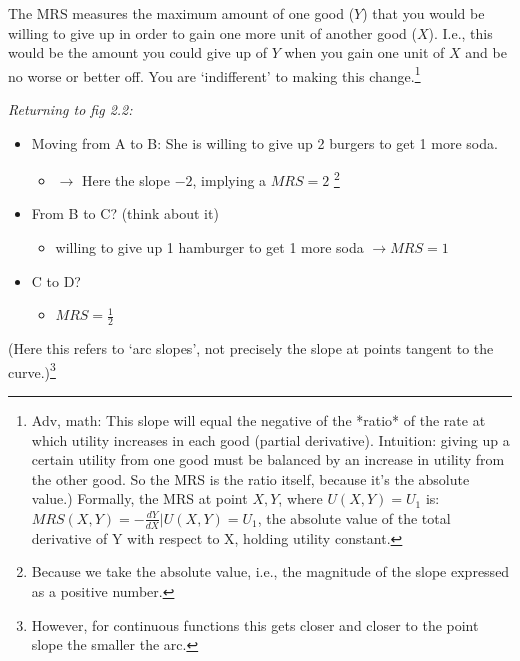 \documentclass[]{article}
\providecommand{\tightlist}{%
  \setlength{\itemsep}{0pt}\setlength{\parskip}{0pt}}
\begin{document}
The MRS measures the maximum amount of one good (\(Y\)) that you would
be willing to give up in order to gain one more unit of another good
(\(X\)). I.e., this would be the amount you could give up of \(Y\) when
you gain one unit of \(X\) and be no worse or better off. You are
`indifferent' to making this change.\footnote{\textcolor{RawSienna}{Adv, math: This slope will equal the negative of the *ratio* of the rate at which utility increases in each good (partial derivative).
  Intuition: giving up a certain utility from one good must be balanced by an increase in utility from the other good.
  So the MRS is the ratio itself, because it's the absolute value.) Formally, the MRS at point $X,Y$, where $U(X,Y)=U_1$ is:
  $MRS(X,Y)=-\frac{dY}{dX}|U(X,Y)=U_1$}, the absolute value of the total
  derivative of Y with respect to X, holding utility constant.}

\bigskip

\emph{Returning to fig 2.2:}

\begin{itemize}
\tightlist
\item
  Moving from A to B: She is willing to give up 2 burgers to get 1 more
  soda.

  \begin{itemize}
  \tightlist
  \item
    \(\rightarrow\) Here the slope \(-2\), implying a \(MRS=2\)
    \footnote{Because we take the absolute value, i.e., the magnitude of
      the slope expressed as a positive number.}
  \end{itemize}
\item
  From B to C? (think about it)

  \begin{itemize}
  \tightlist
  \item
    willing to give up 1 hamburger to get 1 more soda
    \(\rightarrow MRS =1\)
  \end{itemize}
\item
  C to D?

  \begin{itemize}
  \tightlist
  \item
    \(MRS = \frac{1}{2}\)
  \end{itemize}
\end{itemize}

(Here this refers to `arc slopes', not precisely the slope at points
tangent to the curve.)\footnote{However, for continuous functions this
  gets closer and closer to the point slope the smaller the arc.}
\end{document}
